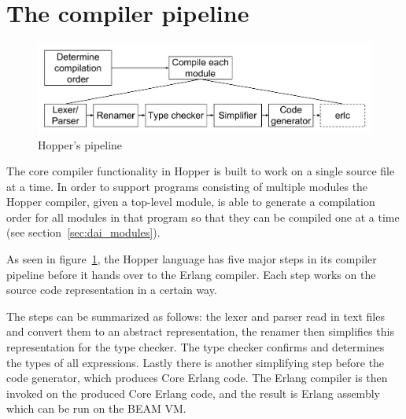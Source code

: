 \section{The compiler pipeline}


\begin{figure}[h!]
\centering
  \includegraphics[width=0.6\pdfpagewidth]{figure/pipeline}
  \caption{Hopper's pipeline}
  \label{fig:pipeline}
\end{figure}

The core compiler functionality in Hopper is built to work on a single source file at a time.
In order to support programs consisting of multiple modules the Hopper compiler,
given a top-level module, is able to generate a compilation order for all modules in that
program so that they can be compiled one at a time (see section~\ref{sec:dai_modules}).

As seen in figure~\ref{fig:pipeline}, the Hopper language has five major steps in its compiler
pipeline before it hands over to the Erlang compiler. Each step works on the 
source code representation in a certain way.

The steps can be summarized as follows: the lexer and parser read in text files and convert
them to an abstract representation, the renamer then simplifies this representation for the 
type checker. The type checker confirms and determines the types of all expressions. Lastly 
there is another simplifying step before the code generator, which produces Core
Erlang code. The Erlang compiler is then invoked on the produced Core Erlang
code, and the result is Erlang assembly which can be run on the BEAM VM.